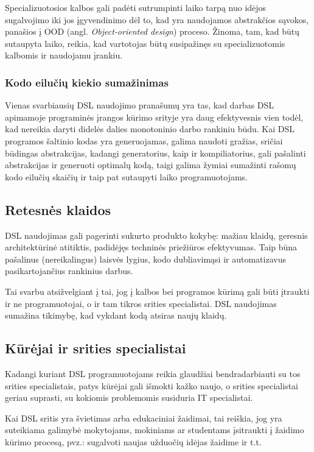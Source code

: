 \documentclass{VUMIFPSkursinis}
\begin{document}
Specializuotosios kalbos gali padėti sutrumpinti laiko tarpą nuo idėjos sugalvojimo iki jos įgyvendinimo dėl to, kad yra naudojamos abstrakčios sąvokos, panašios į OOD (angl. \textit{Object-oriented design}) proceso. Žinoma, tam, kad būtų sutaupyta laiko, reikia, kad vartotojas būtų susipažinęs su specializuotomis kalbomis ir naudojamu įrankiu.

\subsubsection{Kodo eilučių kiekio sumažinimas}

Vienas svarbiausių DSL naudojimo pranašumų yra tas, kad darbas DSL apimamoje programinės įrangos kūrimo srityje yra daug efektyvesnis vien todėl, kad nereikia daryti didelės dalies monotoninio darbo rankiniu būdu. Kai DSL programos šaltinio kodas yra generuojamas, galima naudoti gražias, sričiai būdingas abstrakcijas, kadangi generatorius, kaip ir kompiliatorius, gali pašalinti abstrakcijas ir generuoti optimalų kodą, taigi galima žymiai sumažinti rašomų kodo eilučių skaičių ir taip pat sutaupyti laiko programuotojams.

\subsection{Retesnės klaidos}

DSL naudojimas gali pagerinti sukurto produkto kokybę: mažiau klaidų, geresnis architektūrinė atitiktis, padidėjęs techninės priežiūros efektyvumas. Taip būna pašalinus (nereikalingus) laisvės lygius, kodo dubliavimąsi ir automatizavus pasikartojančius rankinius darbus.

Tai svarbu atsižvelgiant į tai, jog į kalbos bei programos kūrimą gali būti įtraukti ir ne programuotojai, o ir tam tikros srities specialistai. DSL naudojimas sumažina tikimybę, kad vykdant kodą atsiras naujų klaidų. 

\subsection{Kūrėjai ir srities specialistai}

Kadangi kuriant DSL programuotojams reikia glaudžiai bendradarbiauti su tos srities specialistais, patys kūrėjai gali išmokti kažko naujo, o srities specialistai geriau suprasti, su kokiomis problemomis susiduria IT specialistai.

Kai DSL sritis yra švietimas arba edukaciniai žaidimai, tai reiškia, jog yra suteikiama galimybė mokytojams, mokiniams ar studentams įsitraukti į žaidimo kūrimo procesą, pvz.: sugalvoti naujas užduočių idėjas žaidime ir t.t.
\end{document}
